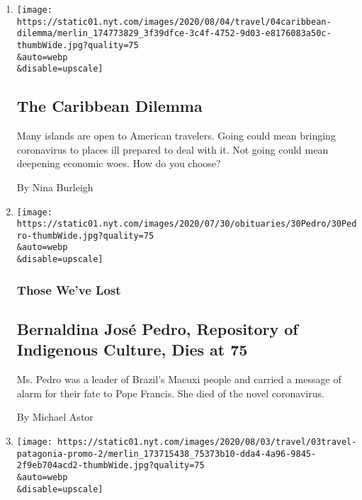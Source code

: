 \begin{enumerate}
\def\labelenumi{\arabic{enumi}.}
\item
  \href{/2020/08/04/travel/coronavirus-caribbean-vacations.html}{}

  \texttt{[image: https://static01.nyt.com/images/2020/08/04/travel/04caribbean-dilemma/merlin\_174773829\_3f39dfce-3c4f-4752-9d03-e8176083a50c-thumbWide.jpg?quality=75\\\&auto=webp\\\&disable=upscale]}

  \hypertarget{the-caribbean-dilemma}{%
  \subsection{The Caribbean Dilemma}\label{the-caribbean-dilemma}}

  Many islands are open to American travelers. Going could mean bringing
  coronavirus to places ill prepared to deal with it. Not going could
  mean deepening economic woes. How do you choose?

  By Nina Burleigh
\item
  \href{/2020/08/03/obituaries/bernaldina-jose-pedro-dead-coronavirus.html}{}

  \texttt{[image: https://static01.nyt.com/images/2020/07/30/obituaries/30Pedro/30Pedro-thumbWide.jpg?quality=75\\\&auto=webp\\\&disable=upscale]}

  \hypertarget{those-weve-lost}{%
  \subsubsection{Those We've Lost}\label{those-weve-lost}}

  \hypertarget{bernaldina-josuxe9-pedro-repository-of-indigenous-culture-dies-at-75}{%
  \subsection{Bernaldina José Pedro, Repository of Indigenous Culture,
  Dies at
  75}\label{bernaldina-josuxe9-pedro-repository-of-indigenous-culture-dies-at-75}}

  Ms. Pedro was a leader of Brazil's Macuxi people and carried a message
  of alarm for their fate to Pope Francis. She died of the novel
  coronavirus.

  By Michael Astor
\item
  \href{/2020/08/03/travel/remote-schools-patagonia.html}{}

  \texttt{[image: https://static01.nyt.com/images/2020/08/03/travel/03travel-patagonia-promo-2/merlin\_173715438\_75373b10-dda4-4a96-9845-2f9eb704acd2-thumbWide.jpg?quality=75\\\&auto=webp\\\&disable=upscale]}


\end{enumerate}
